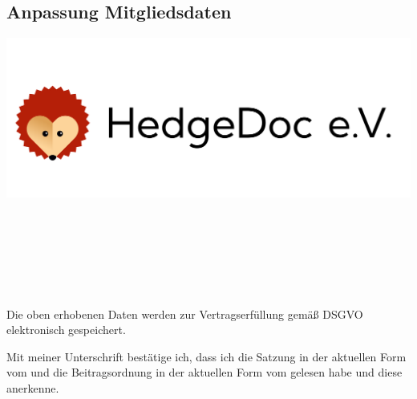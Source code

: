 \documentclass[paper=a4,twoside=false,DIV=15,fontsize=11pt,parskip=half]{scrartcl}
\begin{document}
\begin{Form}

\begin{minipage}[h]{0.5\textwidth}
  \section*{\huge Anpassung Mitgliedsdaten}
\end{minipage}
\begin{minipage}[h]{0.5\textwidth}
  \hfill
  \includegraphics[width=0.3\paperwidth]{./hedgedoc-ev.pdf}
\end{minipage}

\\[0.5em]
\hfill {}\hfill {}\\[2mm]
\\[-\baselineskip]

\\[2mm]
\\[2mm]
\hfill {}\\[-\baselineskip]

Die oben erhobenen Daten werden zur Vertragserfüllung gemäß DSGVO elektronisch gespeichert.

Mit meiner Unterschrift bestätige ich, dass ich die Satzung in der aktuellen Form vom \datumsatzung und die Beitragsordnung in der aktuellen Form vom \datumbeitrago gelesen habe und diese anerkenne.\\

\vspace{1cm}

 \hfill {}\\

\end{Form}
\end{document}
